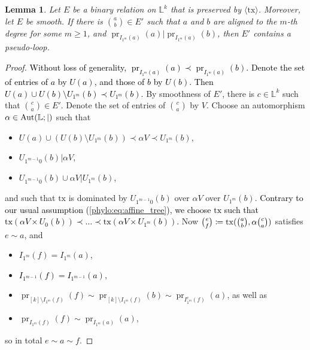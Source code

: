 \documentclass[a4paper,reqno, cleveref]{amsart}
\newcommand{\coloneqq}{\mathrel{\mathop:}\mathrel{\mkern-1.2mu}=}
\newtheorem{lemma}[theorem]{Lemma}
\newcommand{\br}[1]{[#1]}
\newcommand{\struct}[1]{\mathbb{#1}}
\DeclareMathOperator{\pr}{pr}
\DeclareMathOperator{\Aut}{Aut}
\newcommand{\sL}{\mathbb L}
\newcommand{\bin}{E}
\newcommand{\gen}[1]{\langle#1\rangle}
\newcommand{\Phylo}[1]{\ensuremath{(\struct{L};|)}#1}
\newcommand{\tx}{\ensuremath{\mathrm{tx}}\xspace}
\newcommand\mo[1]{\textcolor{black}{#1}} %
\begin{document}
\begin{lemma}\label{phylo:graph:lemma:right_side_split}
    Let $\bin$ be a binary relation on $\sL^k$ that is preserved by $\gen{\tx}$. 
    Moreover, let $\bin$ be smooth. If there is $\binom{a}{b}\in \bin'$ such that $a$ and $b$ are aligned to the $m$-th degree for some $m\geq 1$, and $\pr_{I_{1^{m}}(a)}(a)|\pr_{I_{1^{m}}(a)}(b)$, then $\bin'$ contains a pseudo-loop.
\end{lemma}
\begin{proof}
    \mo{
    Without loss of generality, $\pr_{I_{1^{m}}(a)}(a)\prec\pr_{I_{1^{m}}(a)}(b)$. Denote the set of entries of $a$ by $U(a)$, and those of $b$ by $U(b)$.
    Then $U(a)\cup U(b)\setminus U_{1^m}(b)\prec U_{1^m}(b).$}
    By smoothness of $\bin'$, there is $c\in \sL^k$ such that $\binom{c}{a}\in\bin'$. Denote the set of entries of $\binom{c}{a}$ by $V$.
    Choose an automorphism $\alpha\in\Aut\Phylo$ such that
    \begin{itemize}
        \item $U(a)\cup (U(b)\setminus U_{1^m}(b))\prec \alpha V\prec U_{1^m}(b)$, 
        \item $U_{1^{m-1}0}(b)| \alpha V$,
        \item $U_{1^{m-1}0}(b)\cup \alpha V|U_{1^{m}}(b)$,
    \end{itemize}
    and such that $\tx$ is dominated by $U_{1^{m-1}0}(b)$ over $\alpha V$ over $U_{1^{m}}(b)$.
    \mo{Contrary to our usual assumption (\ref{phylo:eq:affine_tree}), we choose $\tx$ such that $\tx(\alpha V\times U_0(b))\prec\ldots\prec \tx(\alpha V\times U_{1^{m}}(b)).$}
    Now $\binom{e}{f}\coloneqq\tx(\binom{a}{b},\alpha\binom{c}{a})$ satisfies $e\sim a$, and 
    \begin{itemize}
        \item $I_{1^m}(f)=  I_{1^m}(a)$,
        \item \mo{$I_{1^{m-1}}(f)=  I_{1^{m-1}}(a),$}
        \item $\pr_{\br{k}\setminus I_{1^m}(f)}(f)\sim \pr_{\br{k}\setminus I_{1^m}(f)}(b)\sim \pr_{ I_{1^m}^c(f)}(a)$,  as well as
        \item $\pr_{ I_{1^m}(f)}(f)\sim \pr_{ I_{1^m}(a)}(a)$,
    \end{itemize}
    so in total $e\sim a\sim f$.
\end{proof}
\end{document}

